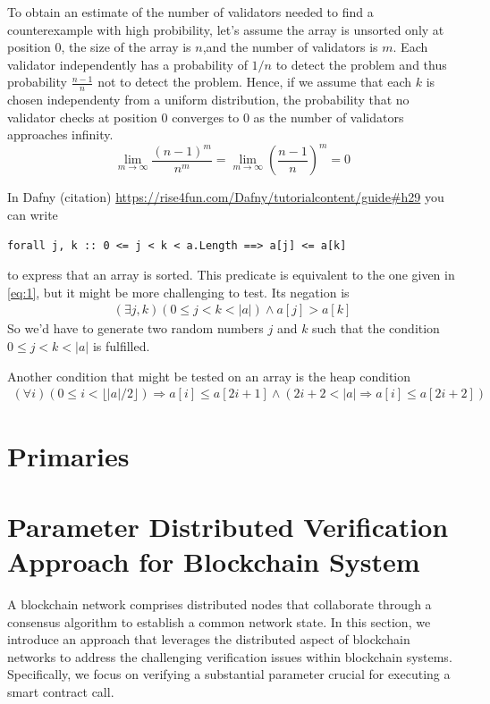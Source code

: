\documentclass[runningheads]{llncs}
\begin{document}
To obtain an estimate of the number of validators needed to find a counterexample with high probibility, let's assume the array is unsorted only at position $0$, the size of the array is $n$,and the number of validators is $m$. Each validator independently has a probability of $1/n$ to detect the problem and thus probability $\frac{n-1} n$ not to detect the problem. Hence, if we assume that each $k$ is chosen independenty from a uniform distribution, the probability that no validator checks at position $0$ converges to $0$ as the number of validators approaches infinity.
\begin{displaymath}
  \lim_{m\to\infty}\frac{(n-1)^m}{n^m}
  = \lim_{m\to\infty} \left(\frac{n-1}{n}\right)^m
  = 0
\end{displaymath}

In Dafny (citation) \url{https://rise4fun.com/Dafny/tutorialcontent/guide#h29} you can
write
\begin{lstlisting}
forall j, k :: 0 <= j < k < a.Length ==> a[j] <= a[k]
\end{lstlisting}
to express that an array is sorted. This predicate is equivalent to the one given in
\eqref{eq:1}, but it might be more challenging to test. Its negation is
\begin{gather}
  \label{eq:2}
  (\exists j, k ) (0\le j< k < |a|) \wedge a[j] > a[k]
\end{gather}
So we'd have to generate two random numbers $j$ and $k$ such that the condition $0 \le
j < k < |a|$ is fulfilled.


Another condition that might be tested on an array is the heap condition
\begin{gather}
  \label{eq:3}
  (\forall i) (0 \le i < \lfloor|a|/2\rfloor) \Rightarrow a[i] \le a[2i+1] \wedge (2i+2
  < |a| \Rightarrow a[i] \le a[2i+2])
\end{gather}

\section{Primaries}
\label{sec:primaries}

\section{Parameter Distributed Verification Approach for Blockchain System}
\label{sec:approach}
A blockchain network comprises distributed nodes that collaborate through a consensus algorithm to establish a common network state. In this section, we introduce an approach that leverages the distributed aspect of blockchain networks to address the challenging verification issues within blockchain systems. Specifically, we focus on verifying a substantial parameter crucial for executing a smart contract call.
\end{document}
